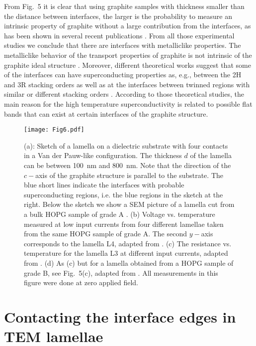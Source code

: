 \documentclass[aps,dvipsnames,twocolumn,floatfix,amsmath]{revtex4-1}
\begin{document}
From Fig.~5  it is clear that using graphite samples with
thickness smaller than the distance between interfaces, the larger
is the probability to measure an intrinsic property of graphite without a large
contribution from the interfaces,
as has been shown in several recent publications
\cite{bar08,zor17,esq14,chap7}. From all those experimental
studies we conclude that there are interfaces with metalliclike
properties. The metalliclike behavior of the transport properties
of graphite is not intrinsic of the graphite ideal structure
\cite{chap7}. Moreover, different theoretical works suggest that
some of the interfaces can have superconducting properties as,
e.g., between the 2H and 3R stacking orders
\cite{mun13,kop13,kopbook} as well as at the interfaces between
twinned regions with similar or different stacking orders
\cite{esqarx14}. According to those theoretical studies,
the main reason for the high temperature superconductivity is
related to possible flat bands \cite{kop11,vol13,hei16,kau16}
that can exist at certain interfaces \cite{fen12,col13,pie15} of the graphite structure.


\begin{figure*}
  \texttt{[image: Fig6.pdf]}
\caption{(a): Sketch of a lamella on a dielectric substrate with
four contacts in a Van der Pauw-like configuration. The thickness
$d$ of the lamella can be between 100~nm and 800~nm. Note that the
direction of the $c-$axis of the graphite structure is parallel to
the substrate. The blue short lines indicate the interfaces with
probable superconducting regions, i.e. the blue regions in the
sketch at the right. Below the sketch we show a SEM picture of a
lamella cut from a bulk HOPG sample of grade A \cite{balthe}. (b)
Voltage vs. temperature measured at low input currents from four
different lamellae taken from the same HOPG sample of grade A. The
second $y-$axis corresponds to the lamella L4, adapted from
\cite{bal13}. (c) The resistance vs. temperature for the lamella
L3 at different input currents, adapted from \cite{bal13}. (d) As
(c) but for a lamella obtained from a HOPG sample of grade B, see
Fig.~5(c), adapted from \cite{bal15}. All measurements in this
figure were done at zero applied field.}
\label{fig6}       %
\end{figure*}

\section{Contacting the interface edges in TEM lamellae}
\label{lame}
\end{document}
